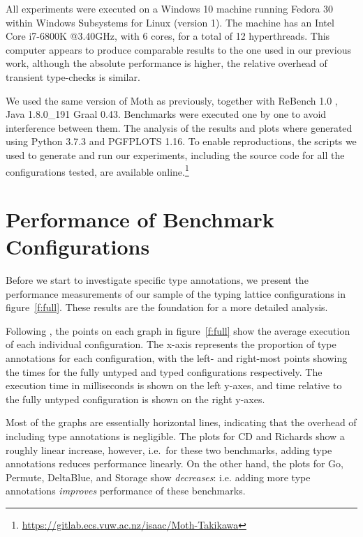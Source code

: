 \documentclass[sigplan,10pt,review,screen]{acmart}\settopmatter{printfolios=true}
\begin{document}
All experiments were executed on a Windows 10 machine
running Fedora 30 within Windows Subsystems for Linux (version 1). The machine has an Intel Core i7-6800K @3.40GHz, with 6 cores, for a total of 12 hyperthreads. This computer appears to produce comparable results to the one used in our previous work, although the absolute performance is higher, the relative overhead of transient type-checks is similar.

We used the same version of Moth as previously, together with ReBench 1.0 \citep{ReBench:2018}, Java 1.8.0\_191 Graal 0.43. Benchmarks were executed one by one to avoid interference between them. The analysis of the results and plots where generated using Python 3.7.3 and PGFPLOTS 1.16. To enable reproductions, the scripts we used to generate and run our experiments, including the source code for all the configurations tested, are available online.\footnote{\url{https://gitlab.ecs.vuw.ac.nz/isaac/Moth-Takikawa}}

\section{Performance of Benchmark Configurations}
\label{s-overall}

\begin{figure*}
	
	\caption{Graphs of (at most) 102 configurations in the typing lattices for each benchmark. Time is measured as the mean of the 351\textsuperscript{st} to the 1,000\textsuperscript{th} benchmark iteration under a single invocation of Moth (lower is better).}
	\label{f:full}
\end{figure*}

Before we start to investigate specific type annotations,
we present the performance measurements of our sample of the typing lattice configurations in figure~\ref{f:full}.
These results are the foundation for a more detailed analysis.

Following \cite{vitousek-transient-arXive-2019}, the points on each graph in figure~\ref{f:full} show the average execution of each individual configuration. The x-axis represents the proportion of type annotations for each configuration, with the left- and right-most points showing the times for the fully untyped and typed configurations respectively. The execution time in milliseconds is shown on the left y-axes, and time relative to the fully untyped configuration is shown on the right y-axes.

Most of the graphs are essentially horizontal lines, indicating that the overhead of including type annotations is negligible. The plots for CD and Richards show a roughly linear increase, however, i.e.\ for these two benchmarks, adding type annotations reduces performance linearly. On the other hand, the plots for Go, Permute, DeltaBlue, and Storage show \emph{decreases}: i.e. adding more type annotations \emph{improves} performance of these benchmarks.
\end{document}
